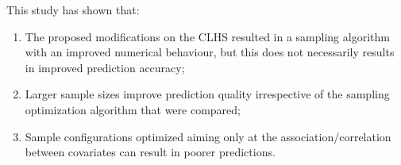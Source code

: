 This study has shown that:

\begin{enumerate}[label = (\Roman*)]
\item The proposed modifications on the CLHS resulted in a sampling algorithm with an improved numerical 
behaviour, but this does not necessarily results in improved prediction accuracy;

\item Larger sample sizes improve prediction quality irrespective of the sampling optimization algorithm that
were compared;

\item Sample configurations optimized aiming only at the association/correlation between covariates can 
result in poorer predictions.
\end{enumerate}

\ifprint
\else
\fi

